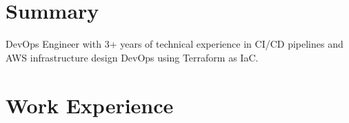 \documentclass[a4paper, oneside, final]{scrartcl} %
\begin{document}
\begin{center} %


{\fontsize{36}{36}\selectfont\scshape{}} %

\vspace{1cm} %


\section{Summary}

DevOps Engineer with 3+ years of technical experience in CI/CD pipelines and AWS infrastructure design DevOps using Terraform as IaC.



\section{Work Experience}


\end{center}
\end{document}
